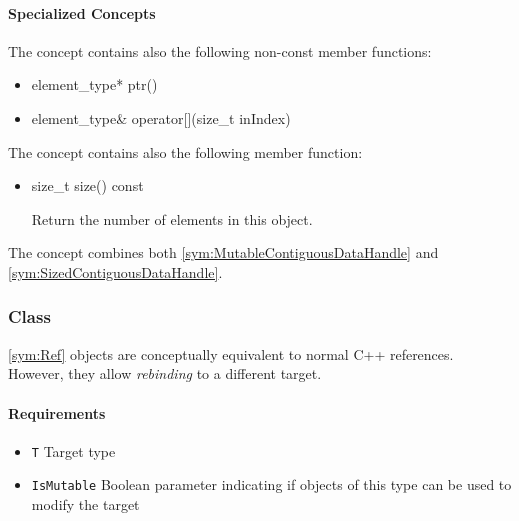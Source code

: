 \paragraph{Specialized Concepts}

The concept  contains also the following non-const member functions:
%
\begin{itemize}
	\item
		\begin{cppsnippet}
		element_type* ptr()
		\end{cppsnippet}

	\item
		\begin{cppsnippet}
		element_type& operator[](size_t inIndex)
		\end{cppsnippet}
\end{itemize}
%
The concept  contains also the following member function:
%
\begin{itemize}
	\item
		\begin{cppsnippet}
		size_t size() const
		\end{cppsnippet}

		Return the number of elements in this object.
\end{itemize}
%
The concept  combines both \ref{sym:MutableContiguousDataHandle} and \ref{sym:SizedContiguousDataHandle}.

\subsubsection[Class Ref]{Class }

\ref{sym:Ref} objects are conceptually equivalent to normal C++ references. However, they allow \emph{rebinding} to a different target.

\paragraph{Requirements}

\begin{itemize}
	\item \texttt{T} Target type
	\item \texttt{IsMutable} Boolean parameter indicating if objects of this type can be used to modify the target
\end{itemize}


